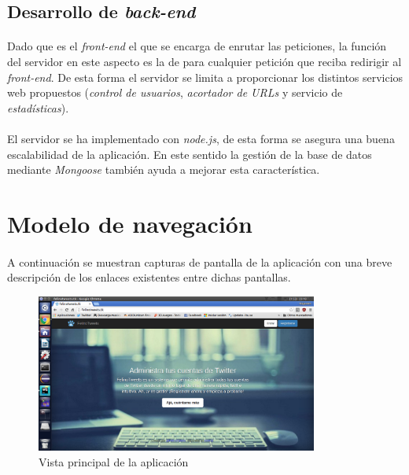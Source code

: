 \documentclass[a4paper]{article}
\begin{document}
	\subsection{Desarrollo de \textit{back-end}}
	
		\paragraph{} Dado que es el \textit{front-end} el que se encarga de enrutar las peticiones, la función del servidor en este aspecto es la de para cualquier petición que reciba redirigir al \textit{front-end}. De esta forma el servidor se limita a proporcionar los distintos servicios web propuestos (\textit{control de usuarios}, \textit{acortador de URLs} y servicio de \textit{estadísticas}).
		
		\paragraph{} El servidor se ha implementado con \textit{node.js}, de esta forma se asegura una buena escalabilidad de la aplicación. En este sentido la gestión de la base de datos mediante \textit{Mongoose} también ayuda a mejorar esta característica.
		
\section{Modelo de navegación}
\paragraph{}A continuación se muestran capturas de pantalla de la aplicación con una breve descripción de los enlaces existentes entre dichas pantallas.
\begin{figure}[H]
	\centering
	\includegraphics[width=350px]{img/main.png}
	\caption{Vista principal de la aplicación}
	\label{fig:diagarq}
\end{figure}
\end{document}
